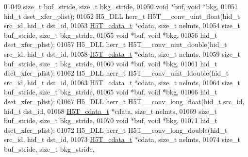 \begin{DoxyCode}
01049                      \textcolor{keywordtype}{size\_t} buf\_stride, \textcolor{keywordtype}{size\_t} bkg\_stride,
01050                                      \textcolor{keywordtype}{void} *buf, \textcolor{keywordtype}{void} *bkg,
01051                                      hid\_t dset\_xfer\_plist);
01052 H5\_DLL herr\_t H5T\_\_conv\_uint\_float(hid\_t src\_id, hid\_t dst\_id,
01053                      \hyperlink{struct_h5_t__cdata__t}{H5T\_cdata\_t} *cdata, \textcolor{keywordtype}{size\_t} nelmts,
01054                      \textcolor{keywordtype}{size\_t} buf\_stride, \textcolor{keywordtype}{size\_t} bkg\_stride,
01055                                      \textcolor{keywordtype}{void} *buf, \textcolor{keywordtype}{void} *bkg,
01056                                      hid\_t dset\_xfer\_plist);
01057 H5\_DLL herr\_t H5T\_\_conv\_uint\_double(hid\_t src\_id, hid\_t dst\_id,
01058                      \hyperlink{struct_h5_t__cdata__t}{H5T\_cdata\_t} *cdata, \textcolor{keywordtype}{size\_t} nelmts,
01059                      \textcolor{keywordtype}{size\_t} buf\_stride, \textcolor{keywordtype}{size\_t} bkg\_stride,
01060                                      \textcolor{keywordtype}{void} *buf, \textcolor{keywordtype}{void} *bkg,
01061                                      hid\_t dset\_xfer\_plist);
01062 H5\_DLL herr\_t H5T\_\_conv\_uint\_ldouble(hid\_t src\_id, hid\_t dst\_id,
01063                      \hyperlink{struct_h5_t__cdata__t}{H5T\_cdata\_t} *cdata, \textcolor{keywordtype}{size\_t} nelmts,
01064                      \textcolor{keywordtype}{size\_t} buf\_stride, \textcolor{keywordtype}{size\_t} bkg\_stride,
01065                                      \textcolor{keywordtype}{void} *buf, \textcolor{keywordtype}{void} *bkg,
01066                                      hid\_t dset\_xfer\_plist);
01067 H5\_DLL herr\_t H5T\_\_conv\_long\_float(hid\_t src\_id, hid\_t dst\_id,
01068                      \hyperlink{struct_h5_t__cdata__t}{H5T\_cdata\_t} *cdata, \textcolor{keywordtype}{size\_t} nelmts,
01069                      \textcolor{keywordtype}{size\_t} buf\_stride, \textcolor{keywordtype}{size\_t} bkg\_stride,
01070                                      \textcolor{keywordtype}{void} *buf, \textcolor{keywordtype}{void} *bkg,
01071                                      hid\_t dset\_xfer\_plist);
01072 H5\_DLL herr\_t H5T\_\_conv\_long\_double(hid\_t src\_id, hid\_t dst\_id,
01073                      \hyperlink{struct_h5_t__cdata__t}{H5T\_cdata\_t} *cdata, \textcolor{keywordtype}{size\_t} nelmts,
01074                      \textcolor{keywordtype}{size\_t} buf\_stride, \textcolor{keywordtype}{size\_t} bkg\_stride,

\end{DoxyCode}
